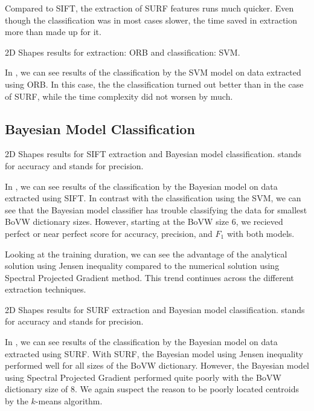 Compared to SIFT, the extraction of SURF features runs much quicker. Even though the classification was in most cases slower, the time saved in extraction more than made up for it.

\begin{table}[ht!]
    \centering
    
    \caption[2D Shapes results for extraction: ORB and classification: SVM]{2D Shapes results for extraction: ORB and classification: SVM.}
    \label{tab:2d_ORB_SVM}
\end{table}
In , we can see results of the classification by the SVM model on data extracted using ORB. In this case, the the classification turned out better than in the case of SURF, while the time complexity did not worsen by much.

\subsection{Bayesian Model Classification}
\begin{table}[ht!]
    \centering
    
    \caption[2D Shapes results for SIFT extraction and Bayesian model classification]{2D Shapes results for SIFT extraction and Bayesian model classification.  stands for accuracy and  stands for precision.}
    \label{tab:2d_SIFT_bayes}
\end{table}
In , we can see results of the classification by the Bayesian model on data extracted using SIFT. In contrast with the classification using the SVM, we can see that the Bayesian model classifier has trouble classifying the data for smallest BoVW dictionary sizes. However, starting at the BoVW size $6$, we recieved perfect or near perfect score for accuracy, precision, and $F_1$ with both models.

Looking at the training duration, we can see the advantage of the analytical solution using Jensen inequality compared to the numerical solution using Spectral Projected Gradient method. This trend continues across the different extraction techniques.

\begin{table}[ht!]
    \centering
    
    \caption[2D Shapes results for SURF extraction and Bayesian model classification]{2D Shapes results for SURF extraction and Bayesian model classification.  stands for accuracy and  stands for precision.}
    \label{tab:2d_SURF_bayes}
\end{table}
In , we can see results of the classification by the Bayesian model on data extracted using SURF. With SURF, the Bayesian model using Jensen inequality performed well for all sizes of the BoVW dictionary. However, the Bayesian model using Spectral Projected Gradient performed quite poorly with the BoVW dictionary size of $8$. We again suspect the reason to be poorly located centroids by the $k$-means algorithm.

